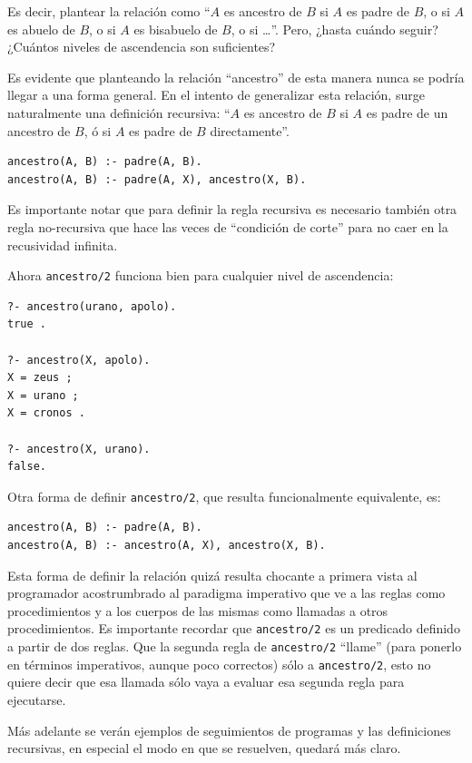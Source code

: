 \documentclass[12pt,titlepage]{article}
\begin{document}
Es decir, plantear la relación como ``$A$ es ancestro de $B$ si $A$ es padre de $B$, o si $A$ es abuelo de $B$, o si $A$ es bisabuelo de $B$, o si \dots''. Pero, ¿hasta cuándo seguir? ¿Cuántos niveles de ascendencia son suficientes?

Es evidente que planteando la relación ``ancestro'' de esta manera nunca se podría llegar a una forma general. En el intento de generalizar esta relación, surge naturalmente una definición recursiva: ``$A$ es ancestro de $B$ si $A$ es padre de un ancestro de $B$, ó si $A$ es padre de $B$ directamente''.
\begin{lstlisting}
ancestro(A, B) :- padre(A, B).
ancestro(A, B) :- padre(A, X), ancestro(X, B).
\end{lstlisting}

Es importante notar que para definir la regla recursiva es necesario también otra regla no-recursiva que hace las veces de ``condición de corte'' para no caer en la recusividad infinita.

Ahora \lstinline|ancestro/2| funciona bien para cualquier nivel de ascendencia:
\begin{lstlisting}
?- ancestro(urano, apolo).
true .

?- ancestro(X, apolo).
X = zeus ;
X = urano ;
X = cronos .

?- ancestro(X, urano).
false.
\end{lstlisting}

Otra forma de definir \lstinline|ancestro/2|, que resulta funcionalmente equivalente, es:
\begin{lstlisting}
ancestro(A, B) :- padre(A, B).
ancestro(A, B) :- ancestro(A, X), ancestro(X, B).
\end{lstlisting}

Esta forma de definir la relación quizá resulta chocante a primera vista al programador acostrumbrado al paradigma imperativo que ve a las reglas como procedimientos y a los cuerpos de las mismas como llamadas a otros procedimientos. Es importante recordar que \lstinline|ancestro/2| es un predicado definido a partir de dos reglas. Que la segunda regla de \lstinline|ancestro/2| ``llame'' (para ponerlo en términos imperativos, aunque poco correctos) sólo a \lstinline|ancestro/2|, esto no quiere decir que esa llamada sólo vaya a evaluar esa segunda regla para ejecutarse.

Más adelante se verán ejemplos de seguimientos de programas y las definiciones recursivas, en especial el modo en que se resuelven, quedará más claro.
\end{document}
